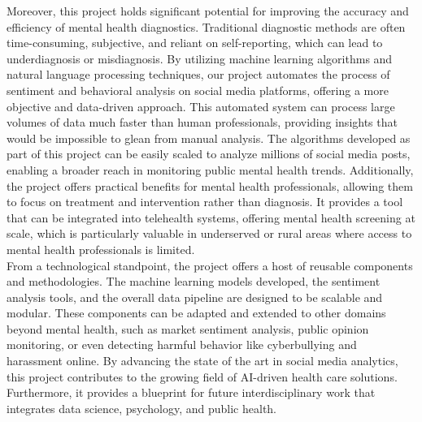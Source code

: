 \noindent
Moreover, this project holds significant potential for improving the accuracy and efficiency of mental health diagnostics. Traditional diagnostic methods are often time-consuming, subjective, and reliant on self-reporting, which can lead to underdiagnosis or misdiagnosis. By utilizing machine learning algorithms and natural language processing techniques, our project automates the process of sentiment and behavioral analysis on social media platforms, offering a more objective and data-driven approach. This automated system can process large volumes of data much faster than human professionals, providing insights that would be impossible to glean from manual analysis. The algorithms developed as part of this project can be easily scaled to analyze millions of social media posts, enabling a broader reach in monitoring public mental health trends. Additionally, the project offers practical benefits for mental health professionals, allowing them to focus on treatment and intervention rather than diagnosis. It provides a tool that can be integrated into telehealth systems, offering mental health screening at scale, which is particularly valuable in underserved or rural areas where access to mental health professionals is limited. \\

\noindent
From a technological standpoint, the project offers a host of reusable components and methodologies. The machine learning models developed, the sentiment analysis tools, and the overall data pipeline are designed to be scalable and modular. These components can be adapted and extended to other domains beyond mental health, such as market sentiment analysis, public opinion monitoring, or even detecting harmful behavior like cyberbullying and harassment online. By advancing the state of the art in social media analytics, this project contributes to the growing field of AI-driven health care solutions. Furthermore, it provides a blueprint for future interdisciplinary work that integrates data science, psychology, and public health. \\


